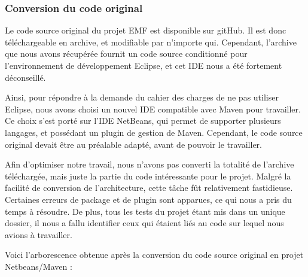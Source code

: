 \documentclass[a4paper]{article}
\begin{document}
		\vspace{0.5cm}

		\subsubsection{Conversion du code original}

		\vspace{0.5cm}

		Le code source original du projet EMF est disponible sur gitHub. Il est donc téléchargeable en archive, et modifiable par n'importe qui. Cependant, l'archive que nous avons récupérée fournit un code source conditionné pour l'environnement de développement Eclipse, et cet IDE nous a été fortement déconseillé.

		\vspace{0.5cm}

		Ainsi, pour répondre à la demande du cahier des charges de ne pas utiliser Eclipse, nous avons choisi un nouvel IDE compatible avec Maven pour travailler. Ce choix s'est porté sur l'IDE NetBeans, qui permet de supporter plusieurs langages, et possédant un plugin de gestion de Maven. Cependant, le code source original devait être au préalable adapté, avant de pouvoir le travailler.

		\vspace{0.5cm}

		Afin d'optimiser notre travail, nous n'avons pas converti la totalité de l'archive téléchargée, mais juste la partie du code intéressante pour le projet. Malgré la facilité de conversion de l'architecture, cette tâche fût relativement fastidieuse. Certaines erreurs de package et de plugin sont apparues, ce qui nous a pris du temps à résoudre. De plus, tous les tests du projet étant mis dans un unique dossier, il nous a fallu identifier ceux qui étaient liés au code sur lequel nous avions à travailler.

		\vspace{0.5cm}

		Voici l'arborescence obtenue après la conversion du code source original en projet Netbeans/Maven : 
\end{document}
